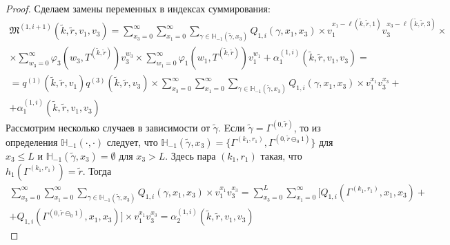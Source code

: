 \documentclass[a4paper,12pt,russian]{extarticle}
\begin{document}
\begin{proof}
Сделаем замены переменных в индексах суммирования:
\begin{multline*}
    \mathfrak{M}^{(1,i+1)}(\tilde{k},\tilde{r},v_1,v_3)  =\sum_{x_3=0}^{\infty} \sum_{x_1=0}^{\infty}  \sum_{\gamma \in {\mathbb H}_{-1}(\tilde{\gamma},x_3)}Q_{1,i}(\gamma,x_1, x_3) 
    \times v_1^{x_1-\ell(\tilde{k},\tilde{r},1)} v_3^{x_3 -\ell(\tilde{k},\tilde{r},3)}\times \\
    \times 
    \sum_{w_3=0 }^{\infty}  \varphi_3(w_3,T^{(\tilde{k},\tilde{r})}) v_3^{w_3}  \times  \sum_{w_1=0}^{\infty}  \varphi_1(w_1,T^{(\tilde{k},\tilde{r})})  v_1^{w_1}  + \alpha_1^{(1,i)}(\tilde{k},\tilde{r},v_1,v_3) = \\
    = q^{(1)}(\tilde{k},\tilde{r},v_1) q^{(3)}(\tilde{k},\tilde{r},v_3)\times 
    \sum_{x_3=0}^{\infty} \sum_{x_1=0}^{\infty}  \sum_{\gamma \in {\mathbb H}_{-1}(\tilde{\gamma},x_3)}Q_{1,i}(\gamma,x_1, x_3) 
    \times v_1^{x_1} v_3^{x_3}+\\
     + \alpha_1^{(1,i)}(\tilde{k},\tilde{r},v_1,v_3)
\end{multline*}
Рассмотрим несколько случаев в зависимости от $\tilde{\gamma}$. Eсли $\tilde{\gamma} = \Gamma^{(0,\tilde{r})}$, то из определения ${\mathbb H}_{-1}(\cdot,\cdot)$ следует, что ${\mathbb H}_{-1}(\tilde{\gamma},x_3) = \{\Gamma^{(k_1,r_1)}, \Gamma^{(0,\tilde{r}\ominus_0 1)}\}$ для $x_3 \leqslant L$ и
${\mathbb H}_{-1}(\tilde{\gamma},x_3) =\emptyset$ для $x_3 > L$. Здесь пара $(k_1,r_1)$ такая, что $h_1(\Gamma^{(k_1,r_1)}) = \tilde{r}$. Тогда 
\begin{multline*}
     \sum_{x_3=0}^{\infty} \sum_{x_1=0}^{\infty}  \sum_{\gamma \in {\mathbb H}_{-1}(\tilde{\gamma},x_3)}Q_{1,i}(\gamma,x_1, x_3) 
    \times v_1^{x_1} v_3^{x_3} =  \sum_{x_3=0}^{L} \sum_{x_1=0}^{\infty} [ Q_{1,i}(\Gamma^{(k_1,r_1)},x_1, x_3) + \\ 
    +Q_{1,i}( \Gamma^{(0,\tilde{r}\ominus_0 1)},x_1, x_3) ]
    \times v_1^{x_1} v_3^{x_3} =  \alpha_2^{(1,i)}(\tilde{k},\tilde{r},v_1,v_3)
\end{multline*}


\end{proof}
\end{document}
